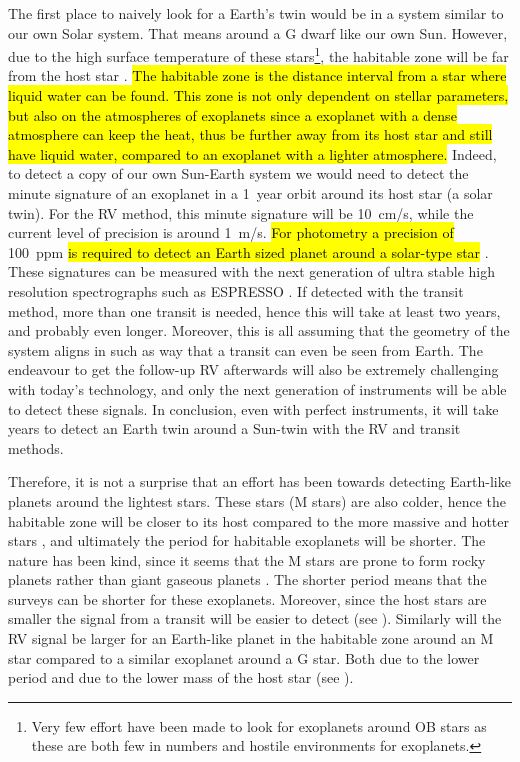 The first place to naively look for a Earth's twin would be in a system similar to our own Solar
system. That means around a G dwarf like our own Sun. However, due to the high surface temperature
of these stars\footnote{Very few effort have been made to look for exoplanets around OB stars as
these are both few in numbers and hostile environments for exoplanets.}, the habitable zone will be
far from the host star \citep[see e.g.][]{Kasting1993}. \hl{The habitable zone is the distance
interval from a star where liquid water can be found. This zone is not only dependent on stellar
parameters, but also on the atmospheres of exoplanets since a exoplanet with a dense atmosphere can
keep the heat, thus be further away from its host star and still have liquid water, compared to an
exoplanet with a lighter atmosphere.} Indeed, to detect a copy of our own Sun-Earth system we would
need to detect the minute signature of an exoplanet in a \SI{1}{year} orbit around its host star (a
solar twin). For the RV method, this minute signature will be \SI{10}{cm/s}, while the current level
of precision is around \SI{1}{m/s}. \hl{For photometry a precision of} \SI{100}{ppm} \hl{is required
to detect an Earth sized planet around a solar-type star} \citep{Borucki2017}. These signatures can
be measured with the next generation of ultra stable high resolution spectrographs such as ESPRESSO
\citep{ESPRESSO}. If detected with the transit method, more than one transit is needed, hence this
will take at least two years, and probably even longer. Moreover, this is all assuming that the
geometry of the system aligns in such as way that a transit can even be seen from Earth. The
endeavour to get the follow-up RV afterwards will also be extremely challenging with today's
technology, and only the next generation of instruments will be able to detect these signals. In
conclusion, even with perfect instruments, it will take years to detect an Earth twin around a
Sun-twin with the RV and transit methods.

Therefore, it is not a surprise that an effort has been towards detecting Earth-like planets around
the lightest stars. These stars (M stars) are also colder, hence the habitable zone will be closer
to its host compared to the more massive and hotter stars \citep{Kasting1997}, and ultimately the
period for habitable exoplanets will be shorter. The nature has been kind, since it seems that the M
stars are prone to form rocky planets rather than giant gaseous planets
\citep{Bonfils2013,Delfosse2013}. The shorter period means that the surveys can be shorter for these
exoplanets. Moreover, since the host stars are smaller the signal from a transit will be easier to
detect (see ). Similarly will the RV signal be larger for an Earth-like planet in
the habitable zone around an M star compared to a similar exoplanet around a G star. Both due to the
lower period and due to the lower mass of the host star (see ).

